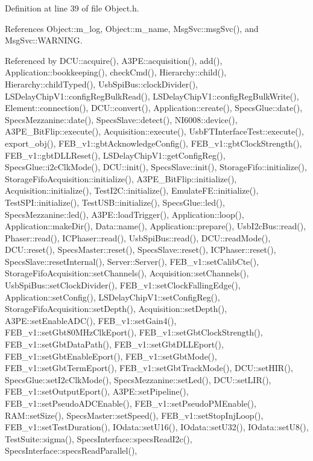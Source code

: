 Definition at line 39 of file Object.\+h.



References Object\+::m\+\_\+log, Object\+::m\+\_\+name, Msg\+Svc\+::msg\+Svc(), and Msg\+Svc\+::\+W\+A\+R\+N\+I\+NG.



Referenced by D\+C\+U\+::acquire(), A3\+P\+E\+::acquisition(), add(), Application\+::bookkeeping(), check\+Cmd(), Hierarchy\+::child(), Hierarchy\+::child\+Typed(), Usb\+Spi\+Bus\+::clock\+Divider(), L\+S\+Delay\+Chip\+V1\+::config\+Reg\+Bulk\+Read(), L\+S\+Delay\+Chip\+V1\+::config\+Reg\+Bulk\+Write(), Element\+::connection(), D\+C\+U\+::convert(), Application\+::create(), Specs\+Glue\+::date(), Specs\+Mezzanine\+::date(), Specs\+Slave\+::detect(), N\+I6008\+::device(), A3\+P\+E\+\_\+\+Bit\+Flip\+::execute(), Acquisition\+::execute(), Usb\+F\+T\+Interface\+Test\+::execute(), export\+\_\+obj(), F\+E\+B\+\_\+v1\+::gbt\+Acknowledge\+Config(), F\+E\+B\+\_\+v1\+::gbt\+Clock\+Strength(), F\+E\+B\+\_\+v1\+::gbt\+D\+L\+L\+Reset(), L\+S\+Delay\+Chip\+V1\+::get\+Config\+Reg(), Specs\+Glue\+::i2c\+Clk\+Mode(), D\+C\+U\+::init(), Specs\+Slave\+::init(), Storage\+Fifo\+::initialize(), Storage\+Fifo\+Acquisition\+::initialize(), A3\+P\+E\+\_\+\+Bit\+Flip\+::initialize(), Acquisition\+::initialize(), Test\+I2\+C\+::initialize(), Emulate\+F\+E\+::initialize(), Test\+S\+P\+I\+::initialize(), Test\+U\+S\+B\+::initialize(), Specs\+Glue\+::led(), Specs\+Mezzanine\+::led(), A3\+P\+E\+::load\+Trigger(), Application\+::loop(), Application\+::make\+Dir(), Data\+::name(), Application\+::prepare(), Usb\+I2c\+Bus\+::read(), Phaser\+::read(), I\+C\+Phaser\+::read(), Usb\+Spi\+Bus\+::read(), D\+C\+U\+::read\+Mode(), D\+C\+U\+::reset(), Specs\+Master\+::reset(), Specs\+Slave\+::reset(), I\+C\+Phaser\+::reset(), Specs\+Slave\+::reset\+Internal(), Server\+::\+Server(), F\+E\+B\+\_\+v1\+::set\+Calib\+Cte(), Storage\+Fifo\+Acquisition\+::set\+Channels(), Acquisition\+::set\+Channels(), Usb\+Spi\+Bus\+::set\+Clock\+Divider(), F\+E\+B\+\_\+v1\+::set\+Clock\+Falling\+Edge(), Application\+::set\+Config(), L\+S\+Delay\+Chip\+V1\+::set\+Config\+Reg(), Storage\+Fifo\+Acquisition\+::set\+Depth(), Acquisition\+::set\+Depth(), A3\+P\+E\+::set\+Enable\+A\+D\+C(), F\+E\+B\+\_\+v1\+::set\+Gain4(), F\+E\+B\+\_\+v1\+::set\+Gbt80\+M\+Hz\+Clk\+Eport(), F\+E\+B\+\_\+v1\+::set\+Gbt\+Clock\+Strength(), F\+E\+B\+\_\+v1\+::set\+Gbt\+Data\+Path(), F\+E\+B\+\_\+v1\+::set\+Gbt\+D\+L\+L\+Eport(), F\+E\+B\+\_\+v1\+::set\+Gbt\+Enable\+Eport(), F\+E\+B\+\_\+v1\+::set\+Gbt\+Mode(), F\+E\+B\+\_\+v1\+::set\+Gbt\+Term\+Eport(), F\+E\+B\+\_\+v1\+::set\+Gbt\+Track\+Mode(), D\+C\+U\+::set\+H\+I\+R(), Specs\+Glue\+::set\+I2c\+Clk\+Mode(), Specs\+Mezzanine\+::set\+Led(), D\+C\+U\+::set\+L\+I\+R(), F\+E\+B\+\_\+v1\+::set\+Output\+Eport(), A3\+P\+E\+::set\+Pipeline(), F\+E\+B\+\_\+v1\+::set\+Pseudo\+A\+D\+C\+Enable(), F\+E\+B\+\_\+v1\+::set\+Pseudo\+P\+M\+Enable(), R\+A\+M\+::set\+Size(), Specs\+Master\+::set\+Speed(), F\+E\+B\+\_\+v1\+::set\+Stop\+Inj\+Loop(), F\+E\+B\+\_\+v1\+::set\+Test\+Duration(), I\+Odata\+::set\+U16(), I\+Odata\+::set\+U32(), I\+Odata\+::set\+U8(), Test\+Suite\+::sigma(), Specs\+Interface\+::specs\+Read\+I2c(), Specs\+Interface\+::specs\+Read\+Parallel(), 